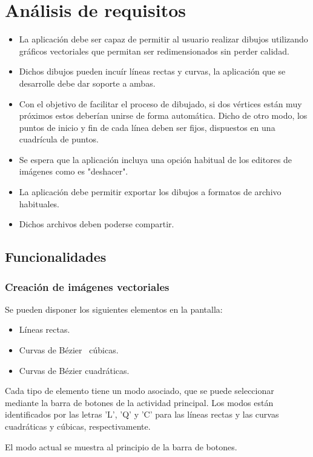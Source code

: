 \documentclass[a4paper,openright,12pt]{article}
\begin{document}
\section{Análisis de requisitos}
\begin{itemize}
    \item La aplicación debe ser capaz de permitir al usuario realizar dibujos utilizando gráficos vectoriales que permitan ser redimensionados sin perder calidad.
    \item Dichos dibujos pueden incuír líneas rectas y curvas, la aplicación que se desarrolle debe dar soporte a ambas.
    \item Con el objetivo de facilitar el proceso de dibujado, si dos vértices están muy próximos estos deberían unirse de forma automática. Dicho de otro modo, los puntos de inicio y fin de cada línea deben ser fijos, dispuestos en una cuadrícula de puntos.
    \item Se espera que la aplicación incluya una opción habitual de los editores de imágenes como es "deshacer".
    \item La aplicación debe permitir exportar los dibujos a formatos de archivo habituales.
    \item Dichos archivos deben poderse compartir.
\end{itemize}

\subsection{Funcionalidades}
\subsubsection{Creación de imágenes vectoriales}
Se pueden disponer los siguientes elementos en la pantalla:
\begin{itemize}
	\item Líneas rectas.
	\item Curvas de Bézier~\cite{Curvas_de_Bezier} cúbicas.
	\item Curvas de Bézier cuadráticas.
\end{itemize}

Cada tipo de elemento tiene un modo asociado,
que se puede seleccionar mediante
la barra de botones de la actividad principal.
Los modos están identificados por las letras  'L', 'Q' y 'C' para
las líneas rectas y las curvas cuadráticas y cúbicas, respectivamente.

El modo actual se muestra al principio de la barra de botones.
\end{document}
